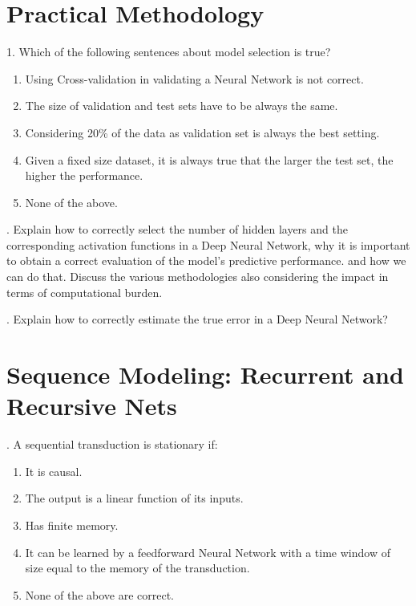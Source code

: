 \section{Practical Methodology}

1. Which of the following sentences about model selection is true?

\begin{enumerate}
    \item Using Cross-validation in validating a Neural Network is not correct.
    \item The size of validation and test sets have to be always the same.
    \item Considering 20\% of the data as validation set is always the best setting.
    \item Given a fixed size dataset, it is always true that  the larger the test set, the higher the performance.
    \item None of the above.
\end{enumerate}

. Explain how to correctly select the number of hidden layers and the corresponding activation functions in a Deep Neural Network, why it is important to obtain a correct evaluation of the model's predictive performance. and how we can do that. Discuss the various methodologies also considering the impact in terms of computational burden.

. Explain how to correctly estimate the true error in a Deep Neural Network?



\section{Sequence Modeling: Recurrent and Recursive Nets }

. A sequential transduction is stationary if:

\begin{enumerate}[label=\roman*]
    \item It is causal.
    \item The output is a linear function of its inputs.
    \item Has finite memory.
    \item It can be learned by a feedforward Neural Network with a time window of size equal to the memory of the transduction.
    \item None of the above are correct.
\end{enumerate}

